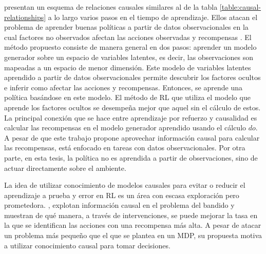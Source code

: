 \citet{lu2018deconfounding} presentan un esquema de relaciones causales similares al de la tabla \ref{table:causal-relationships} a lo largo varios pasos en el tiempo de aprendizaje. Ellos atacan el problema de aprender buenas políticas a partir de datos observacionales en la cual factores no observados afectan las acciones observadas y recompensas \cite{pearl_2009}. El método propuesto consiste de manera general en dos pasos: aprender un modelo generador \cite{jebara2012machine} sobre un espacio de variables latentes, es decir, las observaciones son mapeadas a un espacio de menor dimensión.  Este modelo de variables latentes aprendido a partir de datos observacionales permite descubrir los factores ocultos e inferir como afectar las acciones y recompensas. Entonces, se aprende una política basándose en este modelo. 
El método de RL que utiliza el modelo que aprende los factores ocultos se desempeña mejor que aquel sin el cálculo de estos. La principal conexión que se hace entre aprendizaje por refuerzo y causalidad es calcular las recompensas en el modelo generador aprendido usando el cálculo $do$. A pesar de que este trabajo propone aprovechar información causal para calcular las recompensas, está enfocado en tareas con datos observacionales. 
Por otra parte, en esta tesis, la política no es aprendida a partir de observaciones, sino de actuar directamente sobre el ambiente.


La idea de utilizar conocimiento de modelos
causales para evitar o reducir el aprendizaje a 
prueba y error en RL es un área con escasa 
exploración pero prometedora.
\citet{lattimore2016causal},
explotan información causal en el problema
del bandido y muestran de qué manera, a través
de intervenciones, se puede mejorar la
tasa en la que se identifican las acciones
con una recompensa más alta. A pesar de atacar un problema más pequeño
que el que se plantea en un MDP, su propuesta motiva a utilizar 
conocimiento causal para tomar decisiones.

